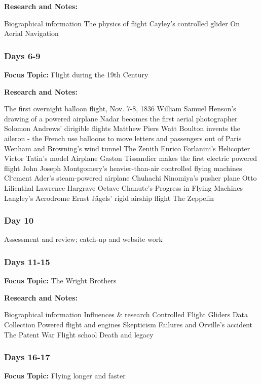 \documentclass[12pt]{article}
\begin{document}
\textbf{Research and Notes:}
\begin{outline}
    \1 Biographical information
\1 The physics of flight
\1 Cayley's controlled glider
\1 On Aerial Navigation
\end{outline}

\subsubsection{Days 6-9}
\textbf{Focus Topic:} Flight during the 19th Century

\textbf{Research and Notes:}
\begin{outline}
    \1 The first overnight balloon flight, Nov. 7-8, 1836
\1 William Samuel Henson's drawing of a powered airplane
\1 Nadar becomes the first aerial photographer
\1 Solomon Andrews' dirigible flights
\1 Matthew Piers Watt Boulton invents the aileron
 - the French use balloons to move letters and passengers out of Paris
\1 Wenham and Browning's wind tunnel
\1 The Zenith
\1 Enrico Forlanini's Helicopter
\1 Victor Tatin's model Airplane
\1 Gaston Tissandier makes the first electric powered flight
\1 John Joseph Montgomery's heavier-than-air controlled flying machines
\1 Cl`ement Ader's steam-powered airplane
\1 Chuhachi Ninomiya's pusher plane
\1 Otto Lilienthal
\1 Lawrence Hargrave
\1 Octave Chanute's Progress in Flying Machines
\1 Langley's Aerodrome
\1 Ernst J\"{a}gels' rigid airship flight
\1 The Zeppelin
\end{outline}

\subsubsection{Day 10}
Assessment and review; catch-up and website work
\subsubsection{Days 11-15}
\textbf{Focus Topic:} The Wright Brothers

\textbf{Research and Notes:}
\begin{outline}
    \1 Biographical information
\1 Influences \& research
\1 Controlled Flight
\1 Gliders
\1 Data Collection
\1 Powered flight and engines
\1 Skepticism
\1 Failures and Orville's accident
\1 The Patent War
\1 Flight school
\1 Death and legacy
\end{outline}
\subsubsection{Days 16-17}
\textbf{Focus Topic:} Flying longer and faster
\end{document}
